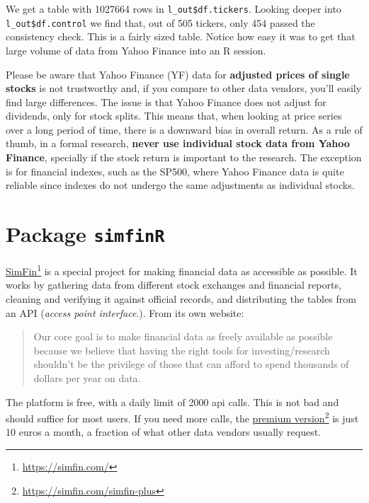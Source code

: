\documentclass[
  12pt,
]{book}
\newenvironment{rmdcaution}
{\begin{cautionblock}
		
	} {\end{cautionblock}}
\begin{document}
We get a table with 1027664 rows in \texttt{l\_out\$df.tickers}. Looking deeper into \texttt{l\_out\$df.control} we find that, out of 505 tickers, only 454 passed the consistency check. This is a fairly sized table. Notice how easy it was to get that large volume of data from Yahoo Finance into an R session.

\begin{rmdcaution}
Please be aware that Yahoo Finance (YF) data for \textbf{adjusted prices
of single stocks} is not trustworthy and, if you compare to other data
vendors, you'll easily find large differences. The issue is that Yahoo
Finance does not adjust for dividends, only for stock splits. This means
that, when looking at price series over a long period of time, there is
a downward bias in overall return. As a rule of thumb, in a formal
research, \textbf{never use individual stock data from Yahoo Finance},
specially if the stock return is important to the research. The
exception is for financial indexes, such as the SP500, where Yahoo
Finance data is quite reliable since indexes do not undergo the same
adjustments as individual stocks.
\end{rmdcaution}

\hypertarget{package-simfinr}{%
\section{\texorpdfstring{Package \texttt{simfinR}}{Package simfinR}}\label{package-simfinr}}

\href{https://simfin.com/}{SimFin}\footnote{\url{https://simfin.com/}} is a special project for making financial data as accessible as possible. It works by gathering data from different stock exchanges and financial reports, cleaning and verifying it against official records, and distributing the tables from an API (\emph{access point interface}.). From its own website:

\begin{quote}
Our core goal is to make financial data as freely available as possible because we believe that having the right tools for investing/research shouldn't be the privilege of those that can afford to spend thousands of dollars per year on data.
\end{quote}

The platform is free, with a daily limit of 2000 api calls. This is not bad and should suffice for most users. If you need more calls, the \href{https://simfin.com/simfin-plus}{premium version}\footnote{\url{https://simfin.com/simfin-plus}} is just 10 euros a month, a fraction of what other data vendors usually request.
\end{document}
